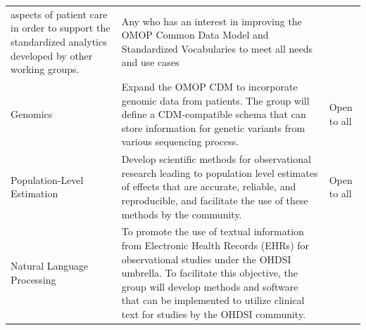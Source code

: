 \documentclass[11pt]{book}
\theoremstyle{definition}
\theoremstyle{definition}
\theoremstyle{definition}
\theoremstyle{remark}
\begin{document}
\begin{longtable}[]{@{}lll@{}}
\begin{minipage}[t]{0.25\columnwidth}
aspects of patient care in order to support the standardized analytics
developed by other working groups.\strut
\end{minipage} & \begin{minipage}[t]{0.14\columnwidth}\raggedright\strut
Any who has an interest in improving the OMOP Common Data Model and
Standardized Vocabularies to meet all needs and use cases\strut
\end{minipage}\tabularnewline
\begin{minipage}[t]{0.08\columnwidth}\raggedright\strut
Genomics\strut
\end{minipage} & \begin{minipage}[t]{0.25\columnwidth}\raggedright\strut
Expand the OMOP CDM to incorporate genomic data from patients. The group
will define a CDM-compatible schema that can store information for
genetic variants from various sequencing process.\strut
\end{minipage} & \begin{minipage}[t]{0.14\columnwidth}\raggedright\strut
Open to all\strut
\end{minipage}\tabularnewline
\begin{minipage}[t]{0.08\columnwidth}\raggedright\strut
Population-Level Estimation\strut
\end{minipage} & \begin{minipage}[t]{0.25\columnwidth}\raggedright\strut
Develop scientific methods for observational research leading to
population level estimates of effects that are accurate, reliable, and
reproducible, and facilitate the use of these methods by the
community.\strut
\end{minipage} & \begin{minipage}[t]{0.14\columnwidth}\raggedright\strut
Open to all\strut
\end{minipage}\tabularnewline
\begin{minipage}[t]{0.08\columnwidth}\raggedright\strut
Natural Language Processing\strut
\end{minipage} & \begin{minipage}[t]{0.25\columnwidth}\raggedright\strut
To promote the use of textual information from Electronic Health Records
(EHRs) for observational studies under the OHDSI umbrella. To facilitate
this objective, the group will develop methods and software that can be
implemented to utilize clinical text for studies by the OHDSI
community.\strut
\end{minipage} & \begin{minipage}[t]{0.14\columnwidth}\raggedright\strut

\end{minipage}
\end{longtable}
\end{document}
